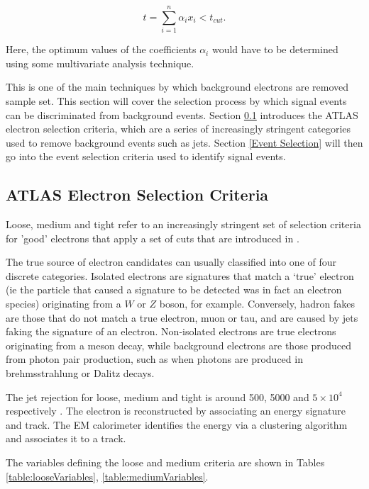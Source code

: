 \documentclass{article}
\begin{document}
\begin{equation}
t = \sum_{i=1}^{n}\alpha_i x_i < t_{cut}.
\end{equation}

Here, the optimum values of the coefficients $\alpha_i$ would have to be determined using some multivariate analysis technique.

This is one of the main techniques by which background electrons are removed sample set. This section will cover the selection process by which signal events can be discriminated from background events. Section \ref{sec:cuts_selection} introduces the ATLAS electron selection criteria, which are a series of increasingly stringent categories used to remove background events such as jets. 
Section \ref{Event Selection} will then go into the event selection criteria used to identify signal events.

\subsection{ATLAS Electron Selection Criteria}
\label{sec:cuts_selection}
Loose, medium and tight refer to an increasingly stringent set of selection criteria for 'good' electrons that apply a set of cuts that are introduced in \cite{expectedElectronPerformance}.

The true source of electron candidates can usually classified into one of four discrete categories. 
Isolated electrons are signatures that match a `true' electron (ie the particle that caused a signature to be detected was in fact an electron species) originating from a $W$ or $Z$ boson, for example. Conversely, hadron fakes are those that do not match a true electron, muon or tau, and are caused by jets faking the signature of an electron.
Non-isolated electrons are true electrons originating from a meson decay, while background electrons are those produced from photon pair production, such as when photons are produced in brehmsstrahlung or Dalitz decays.

The jet rejection for loose, medium and tight is around 500, 5000 and $5\times10^4$  respectively \cite{ElectronPerformanceMeasurements}. The electron is reconstructed by associating an energy signature and track. The EM calorimeter identifies the energy via a clustering algorithm and associates it to a track. 

The variables defining the loose and medium criteria are shown in Tables \ref{table:looseVariables}, \ref{table:mediumVariables}.
\end{document}
